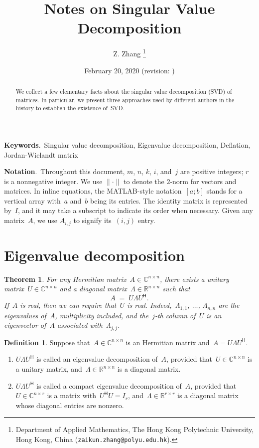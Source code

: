 \documentclass[11pt,a4paper]{article}  %
\title{Notes on Singular Value Decomposition}
\date{February 20, 2020 (revision: \DTMnow)}
\author{
Z. Zhang
\thanks{
Department of Applied Mathematics, The Hong Kong Polytechnic University,
Hong Kong, China ({\tt zaikun.zhang@polyu.edu.hk}).
}
}
\numberwithin{equation}{section}
\newtheorem{theorem}{Theorem}%
\theoremstyle{definition}
\newtheorem{definition}{Definition}%
\def\RR{\mathbb{R}}
\def\CC{\mathbb{C}}
\newcommand{\hmt}{{\scriptscriptstyle{{\mathsf{H}}}}}
\begin{document}
\maketitle

\begin{abstract}
  We collect a few elementary facts about the singular value decomposition (SVD) of matrices. In
  particular, we present three approaches used by different authors in the history
  to establish the existence of~SVD.
\end{abstract}

\textbf{Keywords}.~Singular value decomposition, Eigenvalue decomposition, Deflation,
Jordan-Wielandt matrix

\textbf{Notation}.~Throughout this document, $m$, $n$, $k$, $i$, and~$j$ are positive integers; $r$ is a nonnegative integer.
We use $\|\cdot\|$ to denote the $2$-norm for vectors and matrices.
In inline equations, the MATLAB-style notation~$[a; b]$ stands for a vertical array
with~$a$ and~$b$ being its entries. The identity matrix is represented by~$I$, and it may take
a subscript to indicate its order when necessary. Given any matrix~$A$, we use $A_{i,j}$ to signify
its~$(i,j)$ entry.

\section{Eigenvalue decomposition}

\begin{theorem}
  \label{th:evd}
  For any Hermitian matrix~$A\in \CC^{n\times n}$, there exists a unitary matrix~$U\in
  \CC^{n\times n}$ and a diagonal matrix~$\Lambda \in \RR^{n\times n}$ such that
  \begin{equation*}
    A \; = \; U\Lambda U^\hmt.
  \end{equation*}
  If~$A$ is real, then we can require that~$U$ is real.
  Indeed,~$\Lambda_{1,1}$, $\dots$, $\Lambda_{n,n}$ are the eigenvalues of~$A$, multiplicity
  included, and the~$j$-th column of~$U$ is an eigenvector of~$A$ associated with~$\Lambda_{j,j}$.
\end{theorem}

\begin{definition}
  \label{def:evd}
  Suppose that~$A\in \CC^{n\times n}$ is an Hermitian matrix and~$A = U\Lambda U^\hmt$.
  \begin{enumerate}[leftmargin=1.5em]
    \item
      $U\Lambda U^\hmt$ is called an eigenvalue decomposition of~$A$, provided that~$U
      \in \CC^{n\times n}$ is a unitary matrix, and~$\Lambda \in \RR^{n\times n}$ is a diagonal
      matrix.
    \item
      $U\Lambda U^\hmt$ is called a compact eigenvalue decomposition of~$A$,
      provided that~$U \in \CC^{n\times r}$ is a matrix with~$U^\hmt U = I_r$,
      and~$\Lambda \in \RR^{r\times r}$ is a diagonal matrix whose diagonal entries are nonzero.
  \end{enumerate}
\end{definition}
\end{document}
